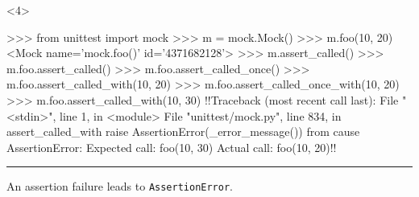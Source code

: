 \documentclass[xcolor={svgnames}]{beamer}
\newcommand{\pycode}[2][]{\lstinline[style=python,#1]{#2}}
\newcommand{\hr}[2]{\vspace{#1}\hrule height 0.01mm\vspace{#2}}
\begin{document}
\begin{frame}[t,fragile]
    \begin{onlyenv}<4>
        \begin{pyenv}[gobble=12]
            >>> from unittest import mock
            >>> m = mock.Mock()
            >>> m.foo(10, 20)
            <Mock name='mock.foo()' id='4371682128'>
            >>> m.assert_called()
            >>> m.foo.assert_called()
            >>> m.foo.assert_called_once()
            >>> m.foo.assert_called_with(10, 20)
            >>> m.foo.assert_called_once_with(10, 20)
            >>> m.foo.assert_called_with(10, 30)
            !!Traceback (most recent call last):
              File "<stdin>", line 1, in <module>
              File "unittest/mock.py", line 834, in assert_called_with
                raise AssertionError(_error_message()) from cause
            AssertionError: Expected call: foo(10, 30)
            Actual call: foo(10, 20)!!
        \end{pyenv}
        \hr{-0.5mm}{-0.5mm}
        \small
        An assertion failure leads to \pycode{AssertionError}.
    \end{onlyenv}
\end{frame}
\end{document}
